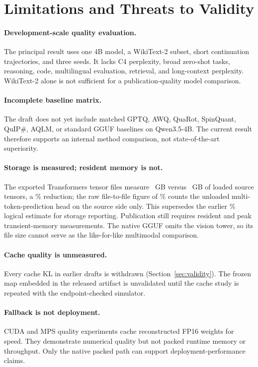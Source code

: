 \documentclass[10pt,twocolumn]{article}
\begin{document}
\section{Limitations and Threats to Validity}

\paragraph{Development-scale quality evaluation.}
The principal result uses one 4B model, a WikiText-2 subset, short continuation
trajectories, and three seeds. It lacks C4 perplexity, broad zero-shot tasks,
reasoning, code, multilingual evaluation, retrieval, and long-context
perplexity. WikiText-2 alone is not sufficient for a publication-quality model
comparison.

\paragraph{Incomplete baseline matrix.}
The draft does not yet include matched GPTQ, AWQ, QuaRot, SpinQuant, QuIP\#,
AQLM, or standard GGUF baselines on Qwen3.5-4B. The current result therefore
supports an internal method comparison, not state-of-the-art superiority.

\paragraph{Storage is measured; resident memory is not.}
The exported Transformers tensor files measure \RotQuantTensorGB{}~GB versus
\SourceTensorExclMtpGB{}~GB of loaded source tensors, a
\LikeForLikeTensorReductionPct\% reduction; the raw file-to-file figure of
\ActualTensorReductionPct\% counts the unloaded multi-token-prediction head on
the source side only. This supersedes the earlier
\EstimatedWeightReductionPct\% logical estimate for storage reporting.
Publication still requires resident and peak transient-memory measurements.
The native GGUF omits the vision tower, so its file size cannot serve as the
like-for-like multimodal comparison.

\paragraph{Cache quality is unmeasured.}
Every cache KL in earlier drafts is withdrawn (Section~\ref{sec:validity}).
The frozen map embedded in the released artifact is unvalidated until the
cache study is repeated with the endpoint-checked simulator.

\paragraph{Fallback is not deployment.}
CUDA and MPS quality experiments cache reconstructed FP16 weights for speed.
They demonstrate numerical quality but not packed runtime memory or throughput.
Only the native packed path can support deployment-performance claims.
\end{document}
